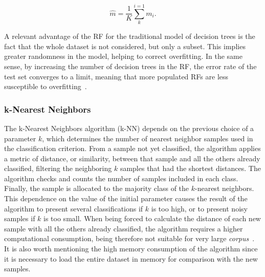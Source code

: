 \documentclass{ieeeaccess}
\begin{document}
\begin{equation}
    \hat{m} = \frac{1}{K} \sum_{k}^{i=1}m_{i}.
\end{equation}

A relevant advantage of the RF for the traditional model of decision trees is the fact that the whole dataset is not considered, but only a subset. This implies greater randomness in the model, helping to correct overfitting. In the same sense, by increasing the number of decision trees in the RF, the error rate of the test set converges to a limit, meaning that more populated RFs are less susceptible to overfitting~\cite{verikas2011mining}.



\subsubsection{k-Nearest Neighbors}

\label{subsec:kvizinhos}

The k-Nearest Neighbors algorithm (k-NN) depends on the previous choice of a parameter $ k $, which determines the number of nearest neighbor samples used in the classification criterion. From a sample not yet classified, the algorithm applies a metric of distance, or similarity, between that sample and all the others already classified, filtering the neighboring $ k $ samples that had the shortest distances. The algorithm checks and counts the number of samples included in each class. Finally, the sample is allocated to the majority class of the $ k $-nearest neighbors. This dependence on the value of the initial parameter causes the result of the algorithm to present several classifications if $ k $ is too high, or to present noisy samples if $ k $ is too small. When being forced to calculate the distance of each new sample with all the others already classified, the algorithm requires a higher computational consumption, being therefore not suitable for very large \textit{corpus}~\cite{kadhim2019survey}. It is also worth mentioning the high memory consumption of the algorithm since it is necessary to load the entire dataset in memory for comparison with the new samples.
\end{document}
